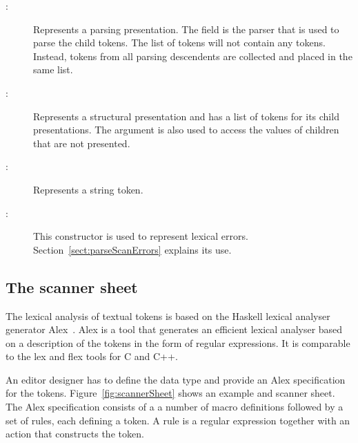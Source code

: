 \documentclass[12pt]{article}
\begin{document}
\begin{description}
\item[:] Represents a parsing presentation. The field  is the parser that is used to parse the child tokens. The list of tokens will not contain any  tokens. Instead, tokens from all parsing descendents are collected and placed in the same list. \\
\item[:] Represents a structural presentation and has a list of tokens for its child presentations. The  argument is also used to access the values of children that are not presented. 
\item[:] Represents a string token. %
\item[:] This constructor is used to represent lexical errors. Section~\ref{sect:parseScanErrors} explains its use. \\
\end{description}




\subsection{The scanner sheet}

The lexical analysis of textual tokens is based on the Haskell lexical analyser generator Alex~\cite{marlow07alex}. Alex is a tool that generates an efficient lexical analyser based on a description of the tokens in the form of regular expressions. It is comparable to the lex and flex tools for C and C++.

An editor designer has to define the data type  and provide an Alex specification for the tokens. Figure~\ref{fig:scannerSheet} shows an example  and scanner sheet. The Alex specification consists of a a number of macro definitions followed by a set of rules, each defining a token. A rule is a regular expression together with an action that constructs the token.
\end{document}

